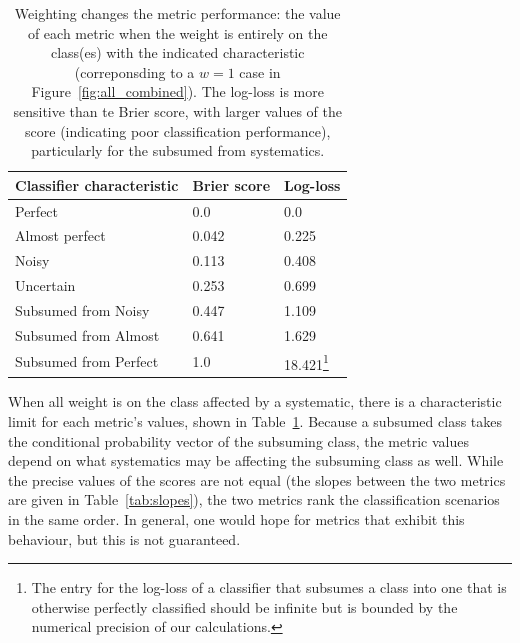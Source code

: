 




\begin{table}[]
\begin{tabular}{lll}
Classifier characteristic & Brier score & Log-loss\\
\hline
Perfect & 0.0 & 0.0\\
Almost perfect & 0.042 & 0.225\\
Noisy & 0.113 & 0.408\\
Uncertain & 0.253 & 0.699\\
Subsumed from Noisy & 0.447 & 1.109\\
Subsumed from Almost & 0.641 & 1.629\\
Subsumed from Perfect & 1.0 & 18.421\footnote{The entry for the log-loss of a classifier that subsumes a class into one that is otherwise perfectly classified should be infinite but is bounded by the numerical precision of our calculations.}
\end{tabular}
\caption{Weighting changes the metric performance: the value of each metric when the weight is entirely on the class(es) with the indicated characteristic (correponsding to a $w=1$ case in Figure~\ref{fig:all_combined}). The log-loss is more sensitive than te Brier score, with larger values of the score (indicating poor classification performance), particularly for the subsumed from systematics.}
\label{tab:extents}
\end{table}

When all weight is on the class affected by a systematic, there is a characteristic limit for each metric's values, shown in Table~\ref{tab:extents}. Because a subsumed class takes the conditional probability vector of the subsuming class, the metric values depend on what systematics may be affecting the subsuming class as well. While the precise values of the scores are not equal (the slopes between the two metrics are given in Table~\ref{tab:slopes}), the two metrics rank the classification scenarios in the same order. 
In general, one would hope for metrics that exhibit this behaviour, but this is not guaranteed.

